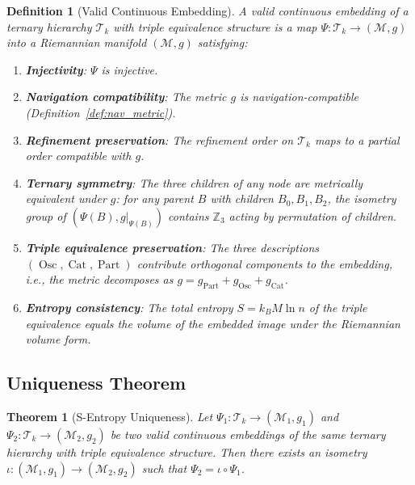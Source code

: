 \documentclass[12pt,twocolumn]{article}
\newtheorem{theorem}{Theorem}[section]
\newtheorem{definition}{Definition}[section]
\DeclareMathOperator{\Cat}{Cat}
\DeclareMathOperator{\Part}{Part}
\DeclareMathOperator{\Osc}{Osc}
\begin{document}
\begin{definition}[Valid Continuous Embedding]
\label{def:valid_embedding}
A \emph{valid continuous embedding} of a ternary hierarchy $\mathcal{T}_k$ with triple equivalence structure is a map $\Psi: \mathcal{T}_k \to (\mathcal{M}, g)$ into a Riemannian manifold $(\mathcal{M}, g)$ satisfying:
\begin{enumerate}
\item[(V1)] \textbf{Injectivity}: $\Psi$ is injective.
\item[(V2)] \textbf{Navigation compatibility}: The metric $g$ is navigation-compatible (Definition~\ref{def:nav_metric}).
\item[(V3)] \textbf{Refinement preservation}: The refinement order on $\mathcal{T}_k$ maps to a partial order compatible with $g$.
\item[(V4)] \textbf{Ternary symmetry}: The three children of any node are metrically equivalent under $g$: for any parent $B$ with children $B_0, B_1, B_2$, the isometry group of $(\Psi(B), g|_{\Psi(B)})$ contains $\mathbb{Z}_3$ acting by permutation of children.
\item[(V5)] \textbf{Triple equivalence preservation}: The three descriptions $(\Osc, \Cat, \Part)$ contribute orthogonal components to the embedding, i.e., the metric decomposes as $g = g_{\Part} + g_{\Osc} + g_{\Cat}$.
\item[(V6)] \textbf{Entropy consistency}: The total entropy $S = k_B M \ln n$ of the triple equivalence equals the volume of the embedded image under the Riemannian volume form.
\end{enumerate}
\end{definition}

\subsection{Uniqueness Theorem}

\begin{theorem}[S-Entropy Uniqueness]
\label{thm:uniqueness}
Let $\Psi_1: \mathcal{T}_k \to (\mathcal{M}_1, g_1)$ and $\Psi_2: \mathcal{T}_k \to (\mathcal{M}_2, g_2)$ be two valid continuous embeddings of the same ternary hierarchy with triple equivalence structure. Then there exists an isometry $\iota: (\mathcal{M}_1, g_1) \to (\mathcal{M}_2, g_2)$ such that $\Psi_2 = \iota \circ \Psi_1$.
\end{theorem}
\end{document}
